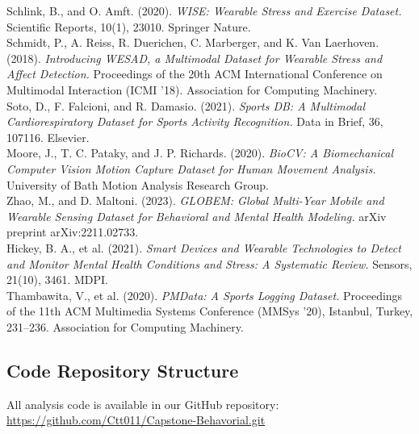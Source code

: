 \documentclass[12pt,letterpaper]{article}
\begin{document}
\noindent Schlink, B., and O. Amft. (2020). \textit{WISE: Wearable Stress and Exercise Dataset.} Scientific Reports, 10(1), 23010. Springer Nature. \\[4pt]
Schmidt, P., A. Reiss, R. Duerichen, C. Marberger, and K. Van Laerhoven. (2018). \textit{Introducing WESAD, a Multimodal Dataset for Wearable Stress and Affect Detection.} Proceedings of the 20th ACM International Conference on Multimodal Interaction (ICMI ’18). Association for Computing Machinery. \\[4pt]
Soto, D., F. Falcioni, and R. Damasio. (2021). \textit{Sports DB: A Multimodal Cardiorespiratory Dataset for Sports Activity Recognition.} Data in Brief, 36, 107116. Elsevier. \\[4pt]
Moore, J., T. C. Pataky, and J. P. Richards. (2020). \textit{BioCV: A Biomechanical Computer Vision Motion Capture Dataset for Human Movement Analysis.} University of Bath Motion Analysis Research Group. \\[4pt]
Zhao, M., and D. Maltoni. (2023). \textit{GLOBEM: Global Multi-Year Mobile and Wearable Sensing Dataset for Behavioral and Mental Health Modeling.} arXiv preprint arXiv:2211.02733. \\[4pt]
Hickey, B. A., et al. (2021). \textit{Smart Devices and Wearable Technologies to Detect and Monitor Mental Health Conditions and Stress: A Systematic Review.} Sensors, 21(10), 3461. MDPI. \\[4pt]
Thambawita, V., et al. (2020). \textit{PMData: A Sports Logging Dataset.} Proceedings of the 11th ACM Multimedia Systems Conference (MMSys ’20), Istanbul, Turkey, 231–236. Association for Computing Machinery.



% 
% 


\clearpage
\makeappendix

\subsection{Code Repository Structure}

All analysis code is available in our GitHub repository: \url{https://github.com/Ctt011/Capstone-Behavorial.git}

\end{document}
